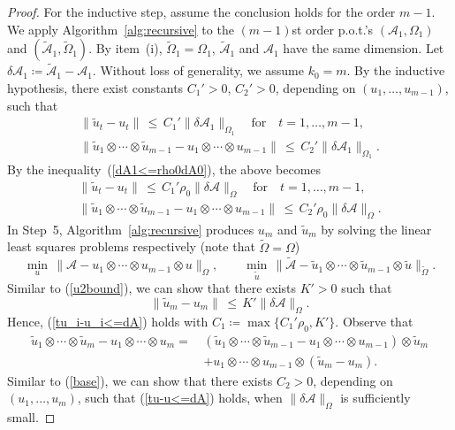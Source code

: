 \documentclass{amsart}
\newcommand{\dt}{\delta}
\newcommand{\tomg}{\widetilde{\Omega}}
\newcommand{\tu}{\tilde{u}}
\newcommand{\reff}[1]{(\ref{#1})}
\newcommand{\mc}[1]{\mathcal{#1}}
\newcommand{\ddd}{,\ldots,}
\theoremstyle{definition}
\numberwithin{equation}{section}
\begin{document}
\begin{proof}
For the inductive step, assume the conclusion holds for the order $m-1$. 
We apply Algorithm~\ref{alg:recursive} to the $(m-1)$st order p.o.t.'s 
$(\mc{A}_1, \Omega_1)$ and $(\widetilde{\mc{A}}_1, \tomg_1)$.
By item~(i),
$\tomg_1 = \Omega_1$, $\widetilde{\mc{A}}_1$ and $\mc{A}_1$ have the same dimension.
Let
$\dt\mc{A}_1 \coloneqq \widetilde{\mc{A}}_1 - \mc{A}_1$.
Without loss of generality, we assume $k_0 = m$.
By the inductive hypothesis, there exist constants $C_1' > 0$, $C_2'>0$, 
depending on $(u_1 \ddd u_{m-1})$, 
such that
\[
\begin{gathered}
\| \tu_t - u_t \| \,\le\, C_1' \|\dt \mc{A}_1\|_{\Omega_1} \quad \text{for} \quad t = 1 \ddd m-1,
\\
\| \tu_1 \otimes \cdots \otimes \tu_{m-1} - u_1 \otimes \cdots \otimes u_{m-1} \| 
\,\le\, C_2' \|\dt \mc{A}_1\|_{\Omega_1}.
\end{gathered}
\]
By the inequality~\reff{dA1<=rho0dA0}, the above becomes
\[
\begin{gathered}
\| \tu_t - u_t \| \,\le\, C_1' \rho_0 \|\dt \mc{A}\|_{\Omega} \quad \text{for} \quad t = 1 \ddd m-1,
\\
\| \tu_1 \otimes \cdots \otimes \tu_{m-1} - u_1 \otimes \cdots \otimes u_{m-1} \| 
\,\le\, C_2' \rho_0  \|\dt \mc{A}\|_{\Omega}.
\end{gathered}
\]
In Step~5, Algorithm~\ref{alg:recursive} produces $u_{m}$ and $\tu_{m}$
by solving the linear least squares problems respectively (note that $\tomg = \Omega$)
\[
\min_{u} \, \| \mc{A} - u_1 \otimes \cdots \otimes u_{m-1} \otimes u \|_{\Omega}, \qquad
\min_{\tu} \, \| \widetilde{\mc{A}} - \tu_1 \otimes \cdots \otimes \tu_{m-1} \otimes \tu \|_{\tomg}.
\]
Similar to \reff{u2bound}, we can show that there exists $K'>0$ such that
\[
\|\tu_{m} - u_{m}\| \,\le\, K' \|\dt \mc{A}\|_{\Omega}.
\]
Hence, \reff{tu_i-u_i<=dA} holds with $C_1 \coloneqq \max\{ C_1'\rho_0, K' \}$.
Observe that
\begin{align*}
\tu_1 \otimes \cdots \otimes \tu_m - u_1 \otimes \cdots \otimes u_m 
=\,& (\tu_1 \otimes \cdots \otimes \tu_{m-1} - u_1 \otimes \cdots \otimes u_{m-1}) \otimes \tu_m \\
& + u_1 \otimes \cdots \otimes u_{m-1} \otimes (\tu_m - u_m).
\end{align*}
Similar to \reff{base}, we can show that there exists $C_2>0$, 
depending on $(u_1 \ddd u_m)$, such that \reff{tu-u<=dA} holds,
when $\|\dt\mc{A}\|_{\Omega}$ is sufficiently small.
\end{proof}
\end{document}
